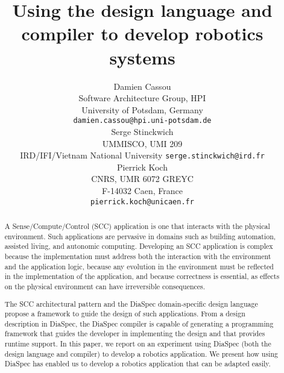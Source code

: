 \documentclass[letterpaper, 10 pt, conference]{ieeeconf}  %
\title{Using the \diaspec{} design language and compiler to develop
  robotics systems}
\author{%
  \parbox{2.4 in}{\centering Damien Cassou\\
    Software Architecture Group, HPI\\
    University of Potsdam, Germany\\%
    {\tt\small damien.cassou@hpi.uni-potsdam.de}}
  \hspace*{ 0.1 in}
  \parbox{2.35 in}{ \centering Serge Stinckwich\\
UMMISCO, UMI 209\\IRD/IFI/Vietnam National University
    {\tt\small serge.stinckwich@ird.fr}}
  \hspace*{ 0.1 in}
  \parbox{1.9 in}{ \centering Pierrick Koch\\
CNRS, UMR 6072 GREYC\\ F-14032 Caen, France\\
    {\tt\small pierrick.koch@unicaen.fr}}
}
\newcommand{\diaspec}{Dia\-Spec\xspace}
\begin{document}
\maketitle
\thispagestyle{empty}
\pagestyle{empty}


\begin{abstract}

  A Sense/Compute/Control (SCC) application is one that interacts with
  the physical environment. Such applications are pervasive in domains
  such as building automation, assisted living, and autonomic
  computing. Developing an SCC application is complex because the
  implementation must address both the interaction with the
  environment and the application logic, because any evolution in the
  environment must be reflected in the implementation of the
  application, and because correctness is essential, as effects on the
  physical environment can have irreversible consequences.

  The SCC architectural pattern and the \diaspec{} domain-specific
  design language propose a framework to guide the design of such
  applications. From a design description in \diaspec{}, the
  \diaspec{} compiler is capable of generating a programming framework
  that guides the developer in implementing the design and that
  provides runtime support. In this paper, we report on an experiment
  using \diaspec{} (both the design language and compiler) to develop
  a robotics application. We present how using \diaspec{} has enabled
  us to develop a robotics application that can be adapted easily.

\end{abstract}










\end{document}
